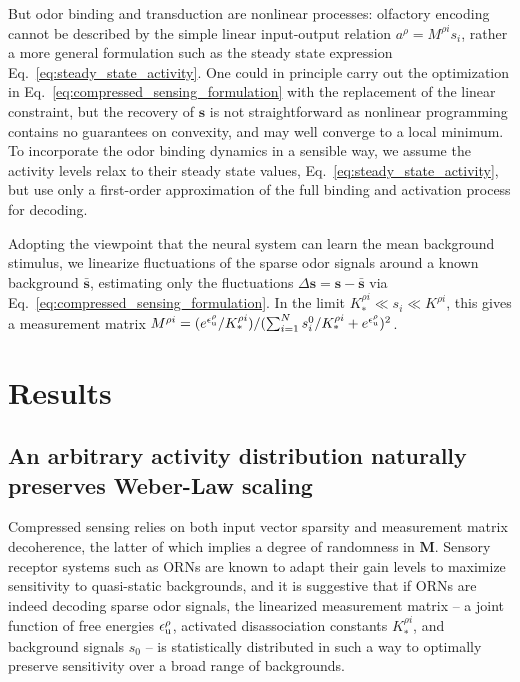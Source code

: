 \documentclass[9pt,twocolumn,twoside]{pnas-new}
\begin{document}
But odor binding and transduction are nonlinear processes: olfactory encoding cannot be described by the simple linear input-output relation $a^\rho = M^{\rho i} s_i$, rather a more general formulation such as the steady state expression Eq.~\ref{eq:steady_state_activity}. One could in principle carry out the optimization in Eq.~\ref{eq:compressed_sensing_formulation} with the replacement of the linear constraint,  but the recovery of $\mathbf s$ is not straightforward as nonlinear programming contains no guarantees on convexity, and may well converge to a local minimum. To incorporate the odor binding dynamics in a sensible way, we assume the activity levels relax to their steady state values, Eq.~\ref{eq:steady_state_activity}, but use only a first-order approximation of the full binding and activation process for decoding. 

Adopting the viewpoint that the neural system can learn the mean background stimulus, we linearize fluctuations of the sparse odor signals around a known background $\bar{\mathbf s}$, estimating only the fluctuations $\Delta \mathbf s = \mathbf s - \bar{\mathbf s}$ via Eq.~\ref{eq:compressed_sensing_formulation}. In the limit $K_*^{\rho i} \ll s_i \ll K^{\rho i}$, this gives a measurement matrix $M^{\rho i} = (e^{\epsilon^\rho_{\text u}}/K_*^{\rho i})/(\sum_{i=1}^N s_i^0/K_*^{\rho i} + e^{\epsilon^\rho_{\text u}})^2$. 

\section*{Results}

\subsection*{An arbitrary activity distribution naturally preserves Weber-Law scaling} 


Compressed sensing relies on both input vector sparsity and measurement matrix decoherence, the latter of which implies a degree of randomness in $\mathbf M$. Sensory receptor systems such as ORNs are known to adapt their gain levels to maximize sensitivity to quasi-static backgrounds, and it is suggestive that if ORNs are indeed decoding sparse odor signals, the linearized measurement matrix -- a joint function of free energies $\epsilon_{\text u}^\rho$, activated disassociation constants $K_*^{\rho i}$, and background signals $s_0$ -- is statistically distributed in such a way to optimally preserve sensitivity over a broad range of backgrounds. 
\end{document}
